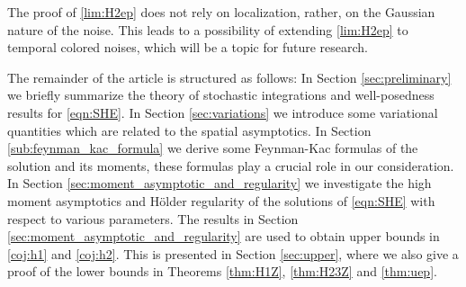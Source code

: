 \documentclass[12pt,reqno]{amsart}
\newtheorem{theorem}{Theorem}[section]
\theoremstyle{remark}
\newcommand{\1}{\mathbf{1}}
\def\RR{\mathbb{R}}
\def\Z{\mathcal{Z}}
\def\cee{{\mathcal E}}
\def\lt{\left}
\def\rt{\right}
\begin{document}
	The proof of \eqref{lim:H2ep} does not rely on localization, rather, on the Gaussian nature of the noise. This leads to a possibility of extending \eqref{lim:H2ep} to temporal colored noises, which will be  a topic for future research.

	The remainder of the article is structured as follows: In Section \ref{sec:preliminary} we briefly summarize the theory of stochastic integrations and well-posedness results for \eqref{eqn:SHE}.   In Section \ref{sec:variations} we introduce some variational quantities which are related to the spatial asymptotics. In Section  \ref{sub:feynman_kac_formula} we derive some Feynman-Kac formulas of the solution and its moments, these formulas play a crucial role in our consideration. In Section \ref{sec:moment_asymptotic_and_regularity} we investigate the high moment asymptotics and H\"older regularity of the solutions of \eqref{eqn:SHE} with respect to various parameters. The results in  Section \ref{sec:moment_asymptotic_and_regularity} are used to obtain upper bounds in \eqref{coj:h1} and \eqref{coj:h2}. This is presented in Section \ref{sec:upper}, where we also give a proof of the lower bounds in Theorems \ref{thm:H1Z}, \ref{thm:H23Z} and \ref{thm:uep}.

\end{document}
